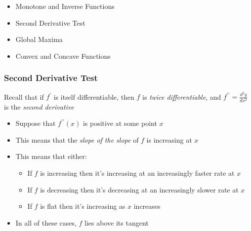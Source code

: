 \documentclass[aspectratio=169, handout]{beamer}
\numberwithin{equation}{section}
\begin{document}
\begin{frame}

\begin{itemize}
\item \textcolor{mygray}{Monotone and Inverse Functions}
\item \textcolor{myblack}{Second Derivative Test}
\item \textcolor{mygray}{Global Maxima}
\item \textcolor{mygray}{Convex and Concave Functions}
\end{itemize}

\end{frame}



\begin{frame}
\frametitle{Second Derivative Test}

Recall that if $f^\prime$ is itself differentiable, then $f$ is \textit{twice differentiable}, and $f^{\prime\prime} = \frac{d^2y}{dx^2}$ is the \textit{second derivative} \pause

\begin{itemize}
\item Suppose that $f^{\prime\prime}(x)$ is positive at some point $x$ \pause
\item This means that the \textit{slope of the slope} of $f$ is increasing at $x$ \pause
\item This means that either:

\begin{itemize}

\item If $f$ is increasing then it's increasing at an increasingly faster rate at $x$ \pause
\item If $f$ is decreasing then it's decreasing at an increasingly slower rate at $x$ \pause
\item If $f$ is flat then it's increasing as $x$ increases \pause

\end{itemize}
\item In all of these cases, $f$ lies above its tangent
\end{itemize}

\end{frame}
\end{document}
